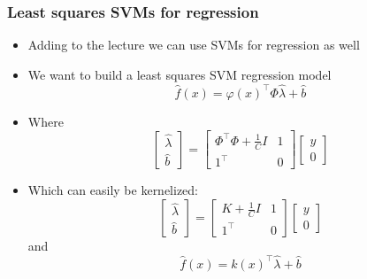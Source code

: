 \documentclass[10pt,aspectratio=169,handout]{beamer}
\begin{document}
\begin{frame}
    \frametitle{Least squares SVMs for regression}

    \begin{itemize}
        \item Adding to the lecture we can use SVMs for regression as well
        \item We want to build a least squares SVM regression model \[\hat{f}(x)=\varphi(x)^\intercal \Phi\hat{\lambda}+\hat{b}\]
        \item Where \[
            \begin{bmatrix}
                \hat{\lambda}\\
                \hat{b}
            \end{bmatrix}=\begin{bmatrix}
                \Phi^\intercal\Phi + \frac{1}{C}I & 1\\
                1^\intercal & 0
            \end{bmatrix}\begin{bmatrix}
                y\\0
            \end{bmatrix}    
        \]
        \item Which can easily be kernelized: \[
            \begin{bmatrix}
                \hat{\lambda}\\
                \hat{b}
            \end{bmatrix}=\begin{bmatrix}
                K + \frac{1}{C}I & 1\\
                1^\intercal & 0
            \end{bmatrix}\begin{bmatrix}
                y\\0
            \end{bmatrix}       
        \] and \[\hat{f}(x)=k(x)^\intercal\hat{\lambda}+\hat{b}\]
    \end{itemize}

\end{frame}
\end{document}
